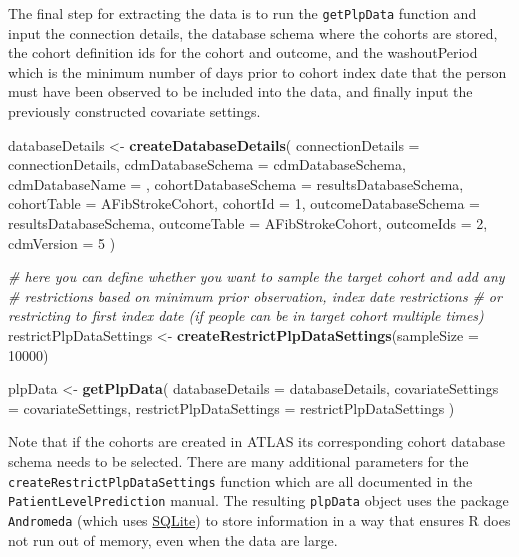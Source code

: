 \documentclass[
]{article}
\newenvironment{Shaded}{\begin{snugshade}}{\end{snugshade}}
\newcommand{\AttributeTok}[1]{\textcolor[rgb]{0.13,0.29,0.53}{#1}}
\newcommand{\CommentTok}[1]{\textcolor[rgb]{0.56,0.35,0.01}{\textit{#1}}}
\newcommand{\DecValTok}[1]{\textcolor[rgb]{0.00,0.00,0.81}{#1}}
\newcommand{\FunctionTok}[1]{\textcolor[rgb]{0.13,0.29,0.53}{\textbf{#1}}}
\newcommand{\NormalTok}[1]{#1}
\newcommand{\OtherTok}[1]{\textcolor[rgb]{0.56,0.35,0.01}{#1}}
\newcommand{\StringTok}[1]{\textcolor[rgb]{0.31,0.60,0.02}{#1}}
\begin{document}
The final step for extracting the data is to run the \texttt{getPlpData}
function and input the connection details, the database schema where the
cohorts are stored, the cohort definition ids for the cohort and
outcome, and the washoutPeriod which is the minimum number of days prior
to cohort index date that the person must have been observed to be
included into the data, and finally input the previously constructed
covariate settings.

\begin{Shaded}
\begin{Highlighting}[]
\NormalTok{databaseDetails }\OtherTok{\textless{}{-}} \FunctionTok{createDatabaseDetails}\NormalTok{(}
  \AttributeTok{connectionDetails =}\NormalTok{ connectionDetails,}
  \AttributeTok{cdmDatabaseSchema =}\NormalTok{ cdmDatabaseSchema,}
  \AttributeTok{cdmDatabaseName =} \StringTok{\textquotesingle{}\textquotesingle{}}\NormalTok{,}
  \AttributeTok{cohortDatabaseSchema =}\NormalTok{ resultsDatabaseSchema,}
  \AttributeTok{cohortTable =} \StringTok{\textquotesingle{}AFibStrokeCohort\textquotesingle{}}\NormalTok{,}
  \AttributeTok{cohortId =} \DecValTok{1}\NormalTok{,}
  \AttributeTok{outcomeDatabaseSchema =}\NormalTok{ resultsDatabaseSchema,}
  \AttributeTok{outcomeTable =} \StringTok{\textquotesingle{}AFibStrokeCohort\textquotesingle{}}\NormalTok{,}
  \AttributeTok{outcomeIds =} \DecValTok{2}\NormalTok{,}
  \AttributeTok{cdmVersion =} \DecValTok{5}
\NormalTok{  )}

\CommentTok{\# here you can define whether you want to sample the target cohort and add any}
\CommentTok{\# restrictions based on minimum prior observation, index date restrictions}
\CommentTok{\# or restricting to first index date (if people can be in target cohort multiple times)}
\NormalTok{restrictPlpDataSettings }\OtherTok{\textless{}{-}} \FunctionTok{createRestrictPlpDataSettings}\NormalTok{(}\AttributeTok{sampleSize =} \DecValTok{10000}\NormalTok{)}

\NormalTok{  plpData }\OtherTok{\textless{}{-}} \FunctionTok{getPlpData}\NormalTok{(}
    \AttributeTok{databaseDetails =}\NormalTok{ databaseDetails, }
    \AttributeTok{covariateSettings =}\NormalTok{ covariateSettings,}
    \AttributeTok{restrictPlpDataSettings =}\NormalTok{ restrictPlpDataSettings}
\NormalTok{  )}
\end{Highlighting}
\end{Shaded}

Note that if the cohorts are created in ATLAS its corresponding cohort
database schema needs to be selected. There are many additional
parameters for the \texttt{createRestrictPlpDataSettings} function which
are all documented in the \texttt{PatientLevelPrediction} manual. The
resulting \texttt{plpData} object uses the package \texttt{Andromeda}
(which uses \href{https://www.sqlite.org/index.html}{SQLite}) to store
information in a way that ensures R does not run out of memory, even
when the data are large.
\end{document}
